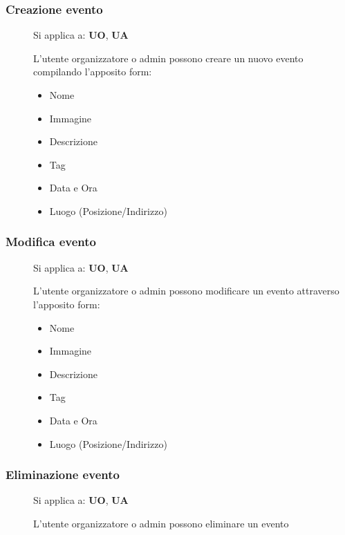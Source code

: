 \documentclass{article}
\begin{document}
\subsubsection{Creazione evento} \label{rf_5}
\begin{description}
    \item[] Si applica a: \textbf{UO}, \textbf{UA}
    \item[] L'utente organizzatore o admin possono creare un nuovo evento compilando l'apposito form:
          \begin{itemize}
              \item Nome
              \item Immagine
              \item Descrizione
              \item Tag
              \item Data e Ora
              \item Luogo (Posizione/Indirizzo)
          \end{itemize}
\end{description}
\subsubsection{Modifica evento} \label{rf_6}
\begin{description}
    \item[] Si applica a: \textbf{UO}, \textbf{UA}
    \item[] L'utente organizzatore o admin possono modificare un evento attraverso l'apposito form:
          \begin{itemize}
              \item Nome
              \item Immagine
              \item Descrizione
              \item Tag
              \item Data e Ora
              \item Luogo (Posizione/Indirizzo)
          \end{itemize}
\end{description}
\subsubsection{Eliminazione evento} \label{rf_7}
\begin{description}
    \item[] Si applica a: \textbf{UO}, \textbf{UA}
    \item[] L'utente organizzatore o admin possono eliminare un evento
\end{description}
\end{document}
